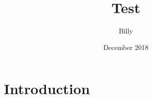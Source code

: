 \documentclass{article}
\title{Test}
\author{Billy }
\date{December 2018}
\begin{document}
\maketitle

\section{Introduction}
\end{document}
